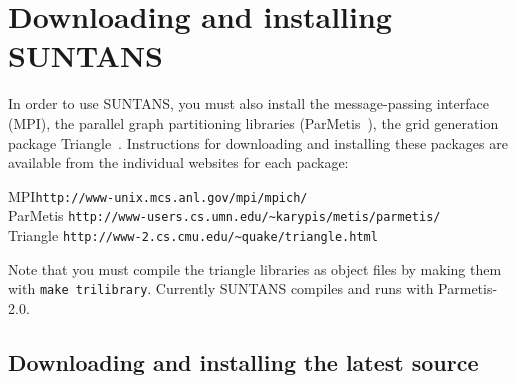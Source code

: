 \section{Downloading and installing SUNTANS}

In order to use SUNTANS, you must also install the message-passing
interface (MPI), the parallel graph partitioning libraries (ParMetis~\cite{PARMETIS[1998]}),
the grid generation package Triangle~\cite{TRIANGLE[1996]}.  Instructions for 
downloading and installing these packages are available from the individual websites
for each package:
\begin{tabbing}
MPI\hspace{0.5in}\=  \verb+http://www-unix.mcs.anl.gov/mpi/mpich/+\\
ParMetis \> \verb+http://www-users.cs.umn.edu/~karypis/metis/parmetis/+\\
Triangle \> \verb+http://www-2.cs.cmu.edu/~quake/triangle.html+
\end{tabbing}
Note that you must compile the triangle libraries as object files by making them
with \verb+make trilibrary+.  Currently SUNTANS compiles and runs with Parmetis-2.0.

\subsection{Downloading and installing the latest source} \label{sec:download}

